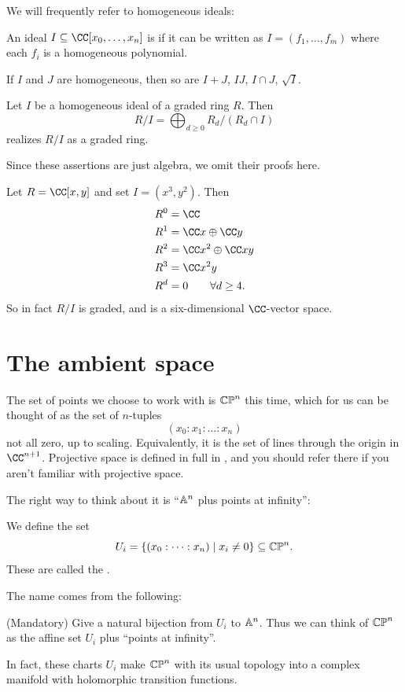 We will frequently refer to homogeneous ideals:
\begin{definition}
	An ideal $I \subseteq \CC[x_0, \dots, x_n]$ is 
	if it can be written as $I = (f_1, \dots, f_m)$
	where each $f_i$ is a homogeneous polynomial.
\end{definition}
\begin{remark}
	If $I$ and $J$ are homogeneous,
	then so are $I+J$, $IJ$, $I \cap J$, $\sqrt I$.
\end{remark}
\begin{lemma}
	Let $I$ be a homogeneous ideal of a graded ring $R$.
	Then
	\[ R/I = \bigoplus_{d \ge 0} R_d / (R_d \cap I) \]
	realizes $R/I$ as a graded ring.
\end{lemma}
Since these assertions are just algebra,
we omit their proofs here.
\begin{example}
	Let $R = \CC[x,y]$ and set $I = (x^3, y^2)$. Then
	\begin{align*}
		R^0 &= \CC \\
		R^1 &= \CC x \oplus \CC y \\
		R^2 &= \CC x^2 \oplus \CC xy \\
		R^3 &= \CC x^2y \\
		R^d &= 0 \qquad \forall d \ge 4.
	\end{align*}
	So in fact $R/I$ is graded, and is a six-dimensional $\CC$-vector space.
\end{example}


\section{The ambient space}
The set of points we choose to work with is $\mathbb{CP}^n$ this time,
which for us can be thought of as the set of $n$-tuples
\[ \left( x_0 : x_1 : \dots : x_n \right) \]
not all zero, up to scaling.
Equivalently, it is the set of lines through the origin in $\CC^{n+1}$.
Projective space is defined in full in ,
and you should refer there if you aren't familiar with projective space.

The right way to think about it is ``$\mathbb A^n$ plus points at infinity'':
\begin{definition}
	We define the set
	\[ U_i = \left\{ (x_0 : \dots : x_n) \mid x_i \neq 0  \right\}
		\subseteq \mathbb{CP}^n. \]
	These are called the .
\end{definition}
The name comes from the following:
\begin{exercise}
	(Mandatory)
	Give a natural bijection from $U_i$ to $\mathbb A^n$.
	Thus we can think of $\mathbb{CP}^n$ as the affine set $U_i$
	plus ``points at infinity''.
\end{exercise}
\begin{remark}
	In fact, these charts $U_i$ make $\mathbb{CP}^n$ with its usual topology
	into a complex manifold with holomorphic transition functions.
\end{remark}

